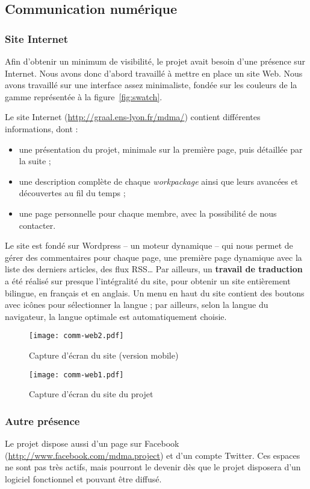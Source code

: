 \subsection{Communication numérique}
\subsubsection{Site Internet}
\par Afin d'obtenir un minimum de visibilité, le projet avait besoin d'une présence sur Internet. Nous avons donc d'abord travaillé à mettre en place un site Web. Nous avons travaillé sur une interface assez minimaliste, fondée sur les couleurs de la gamme représentée à la figure~\ref{fig:swatch}.
\par Le site Internet (\url{http://graal.ens-lyon.fr/mdma/}) contient différentes informations, dont :
\begin{itemize}
  \item une présentation du projet, minimale sur la première page, puis détaillée par la suite ;
  \item une description complète de chaque \emph{workpackage} ainsi que leurs avancées et découvertes au fil du temps ;
  \item une page personnelle pour chaque membre, avec la possibilité de nous contacter.
\end{itemize}
\par Le site est fondé sur Wordpress -- un moteur dynamique -- qui nous permet de gérer des commentaires pour chaque page, une première page dynamique avec la liste des derniers articles, des flux RSS… Par ailleurs, un \textbf{travail de traduction} a été réalisé sur presque l'intégralité du site, pour obtenir un site entièrement bilingue, en français et en anglais. Un menu en haut du site contient des boutons avec icônes pour sélectionner la langue ; par ailleurs, selon la langue du navigateur, la langue optimale est automatiquement choisie.
\begin{figure}[H]
  \centering
    \texttt{[image: comm-web2.pdf]}
  \caption{Capture d'écran du site (version mobile)}
\end{figure}
\begin{figure}[H]
  \centering
    \texttt{[image: comm-web1.pdf]}
  \caption{Capture d'écran du site du projet}
\end{figure}
\subsubsection{Autre présence}
\par Le projet dispose aussi d'un page sur Facebook (\url{http://www.facebook.com/mdma.project}) et d'un compte Twitter. Ces espaces ne sont pas très actifs, mais pourront le devenir dès que le projet disposera d'un logiciel fonctionnel et pouvant être diffusé.
